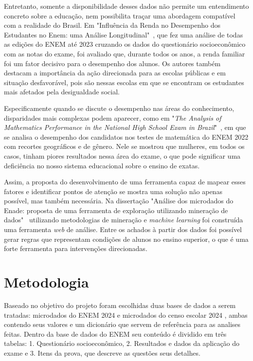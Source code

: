 \documentclass[12pt]{article}
\begin{document}
Entretanto, somente a disponibilidade desses dados \cite{misc:micro_enem} \cite{misc:micro_escolas} não permite um entendimento concreto sobre a educação, nem possibilita traçar uma abordagem compatível com a realidade do Brasil. Em "Influência da Renda no Desempenho dos Estudantes no Enem: uma Análise Longitudinal"~\cite{article:renda_enem}, que fez uma análise de todas as edições do ENEM até 2023 cruzando os dados do questionário socioeconômico com as notas do exame, foi avaliado que, durante todos os anos, a renda familiar foi um fator decisivo para o desempenho dos alunos. Os autores também destacam a importância da ação direcionada para as escolas públicas e em situação desfavorável, pois são nessas escolas em que se encontram os estudantes mais afetados pela desigualdade social.

Especificamente quando se discute o desempenho nas áreas do conhecimento, disparidades mais complexas podem aparecer, como em "\textit{The Analysis of Mathematics Performance in the National High School Exam in Brazil}"~\cite{article:mat_enem}, em que se analisa o desempenho dos candidatos nos testes de matemática do ENEM 2022 com recortes geográficos e de gênero. Nele se mostrou que mulheres, em todos os casos, tinham piores resultados nessa área do exame, o que pode significar uma deficiência no nosso sistema educacional sobre o ensino de exatas.

Assim, a proposta do desenvolvimento de uma ferramenta capaz de mapear esses fatores e identificar pontos de atenção se mostra uma solução não apenas possível, mas também necessária. Na dissertação "Análise dos microdados do Enade: proposta de uma ferramenta de exploração utilizando mineração de dados"~\cite{mastersthesis:md_enade} utilizando metodologias de mineração e \textit{machine learning} foi construída uma ferramenta \textit{web} de análise. Entre os achados à partir dos dados foi possível gerar regras que representam condições de alunos no ensino superior, o que é uma forte ferramenta para intervenções direcionadas.

\section{Metodologia}

Baseado no objetivo do projeto foram escolhidas duas bases de dados a serem tratadas: microdados do ENEM 2024 \cite{misc:micro_enem} e microdados do censo escolar 2024 \cite{misc:micro_escolas}, ambas contendo seus valores e um dicionário que servem de referência para as analises feitas. Dentro da base de dados do ENEM seu conteúdo é dividido em três tabelas: 1. Questionário socioeconômico, 2. Resultados e dados da aplicação do exame e 3. Itens da prova, que descreve as questões seus detalhes.
\end{document}
